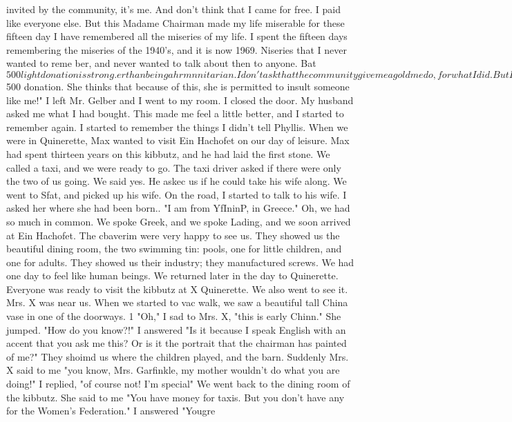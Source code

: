 invited by the community, it's me. And don't think that I came for free. I paid like 
everyone else. But this Madame Chairman made my life miserable for these fifteen day 
I have remembered all the miseries of my life. I spent the fifteen days remembering 
the miseries of the 1940's, and it is now 1969. Niseries that I never wanted to reme 
ber, and never wanted to talk about then to anyone. Bat $500 light donation is strong. 
er than being a hrmnnitarian. I don't ask that the community give me a gold medo, for 
what I did. But I will not let myself be insulted any more, especially when it is 
owing from some ignorant person because she gave SAR a $500 donation. She thinks 
that because of this, she is permitted to insult someone like me!" 
I left Mr. Gelber and I went to my room. I closed the door. My husband asked 
me what I had bought. This made me feel a little better, and I started to remember 
again. 
I started to remember the things I didn't tell Phyllis. When we were in Quinerette, 
Max wanted to visit Ein Hachofet on our day of leisure. Max had spent thirteen years 
on this kibbutz, and he had laid the first stone. We called a taxi, and we were ready to 
go. The taxi driver asked if there were only the two of us going. We said yes. He askec 
us if he could take his wife along. We went to Sfat, and picked up his wife. 
On the road, I started to talk to his wife. I asked her where she had been born.. 
"I am from YfIninP, in Greece." Oh, we had so much in common. We spoke Greek, and we 
spoke Lading, and we soon arrived at Ein Hachofet. 
The cbaverim were very happy to see us. They showed us the beautiful dining room, 
the two swimming tin: pools, one for little children, and one for adults. They showed 
us their industry; they manufactured screws. We had one day to feel like human beings. 
We returned later in the day to Quinerette. 
Everyone was ready to visit the kibbutz at X Quinerette. We also went to see it. 
Mrs. X was near us. When we started to vac walk, we saw a beautiful tall China vase in 
one of the doorways. 1 
"Oh," I sad to Mrs. X, "this is early Chinn." 
She jumped. "How do you know?!" 
I answered "Is it because I speak English with an accent that you ask me this? Or 
is it the portrait that the chairman has painted of me?" 
They shoimd us where the children played, and the barn. Suddenly Mrs. X said to me 
"you know, Mrs. Garfinkle, my mother wouldn't do what you are doing!" I replied, "of 
course not! I'm special" 
We went back to the dining room of the kibbutz. She said to me "You have money 
for taxis. But you don't have any for the Women's Federation." I answered "Yougre 
